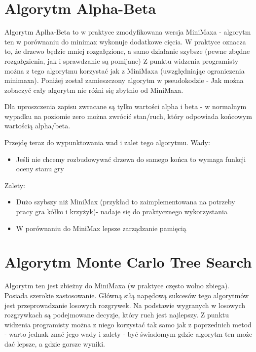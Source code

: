 \documentclass[declaration,shortabstract,inz]{iithesis}
\begin{document}
\section{Algorytm Alpha-Beta}
Algorytm Aplha-Beta to w praktyce zmodyfikowana wersja MiniMaxa - algorytm ten w porównaniu do minimax wykonuje dodatkowe cięcia.
W praktyce oznacza to, że drzewo będzie mniej rozgałęzione, a samo działanie szybsze (pewne zbędne rozgałęzienia, jak i sprawdzanie są pomijane)
Z punktu widzenia programisty można z tego algorytmu korzystać jak z MiniMaxa (uwzględniając ograniczenia minimaxa).
Poniżej został zamieszczony algorytm w pseudokodzie - Jak można zobaczyć cały algorytm nie różni się zbytnio od MiniMaxa.

\newpage

Dla uproszczenia zapisu zwracane są tylko wartości alpha i beta - w normalnym wypadku na poziomie zero można zwrócić stan/ruch, który odpowiada końcowym wartością alpha/beta.

Przejdę teraz do wypunktowania wad i zalet tego algorytmu.
\newline Wady:
\begin{itemize}
  \item Jeśli nie chcemy rozbudowywać drzewa do samego końca to wymaga funkcji oceny stanu gry
\end{itemize}
Zalety:
\begin{itemize}
  \item Dużo szybszy niż MiniMax (przykład to zaimplementowana na potrzeby pracy gra kółko i krzyżyk)- nadaje się do praktycznego wykorzystania
  \item W porównaniu do MiniMax lepsze zarządzanie pamięcią
\end{itemize}


\section{Algorytm Monte Carlo Tree Search}
Algorytm ten jest zbieżny do MiniMaxa (w praktyce często wolno zbiega). Posiada szerokie zastosowanie.
Główną siłą napędową sukcesów tego algorytmów jest przeprowadzanie losowych rozgrywek.
Na podstawie wygranych w losowych rozgrywkach są podejmowane decyzje, który ruch jest najlepszy.
Z punktu widzenia programisty można z niego korzystać tak samo jak z poprzednich metod - warto jednak znać jego wady i zalety - być świadomym gdzie algorytm ten może dać lepsze, a gdzie gorsze wyniki.
\end{document}
